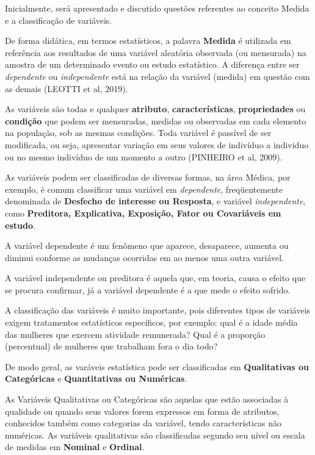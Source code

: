 Inicialmente, será apresentado e discutido questões referentes ao conceito Medida e a classificação de variáveis.\vskip0.3cm

De forma didática, em termos estatísticos, a palavra \textbf{Medida} é utilizada em referência aos resultados de uma variável aleatória observada (ou mensurada) na amostra de um determinado evento ou estudo estatístico. A diferença entre ser \textit{dependente} ou \textit{independente} está na relação da variável (medida) em questão com as demais (LEOTTI et al, 2019).\vskip0.3cm

As variáveis são todas e qualquer \textbf{atributo}, \textbf{características}, \textbf{propriedades} ou \textbf{condição} que podem ser mensuradas, medidas ou observadas em cada elemento na população, sob as mesmas condições. Toda variável é passível de ser modificada, ou seja, apresentar variação em seus valores de indivíduo a individuo ou no mesmo indivíduo de um momento a outro (PINHEIRO et al, 2009).\vskip0.3cm 

As variáveis podem ser classificadas de diversas formas, na área Médica, por exemplo, é comum classificar uma variável em  \textit{dependente}, freqüentemente denominada de \textbf{Desfecho de interesse ou Resposta}, e variável \textit{independente}, como \textbf{Preditora, Explicativa, Exposição, Fator ou Covariáveis em estudo}. \vskip0.3cm 


A variável dependente é um fenômeno que aparece, desaparece, aumenta ou diminui conforme as mudanças ocorridas em ao menos uma outra variável.\vskip0.3cm 

A variável independente ou preditora é aquela que, em teoria, causa o efeito que se procura confirmar, já a variável dependente é a que mede o efeito sofrido.\vskip0.3cm



A classificação das variáveis é muito importante, pois diferentes tipos de variáveis exigem tratamentos estatísticos específicos, por exemplo: qual é a idade média das mulheres
que exercem atividade remunerada? Qual é a proporção (percentual) de mulheres que trabalham fora o dia todo?
\vskip0.3cm



\inic De modo geral, as varáveis estatística pode ser classificadas em \textbf{Qualitativas ou Categóricas} e \textbf{Quantitativas ou Numéricas}.\vskip0.3cm

\inic As Variáveis Qualitativas ou Categóricas são aquelas que estão associadas à qualidade ou quando seus valores forem expressos em forma de atributos, conhecidos também como categorias da variável, tendo características não numéricas. As variáveis qualitativas são classificadas segundo seu nível ou escala de medidas em \textbf{Nominal} e \textbf{Ordinal}.\vskip0.3cm


